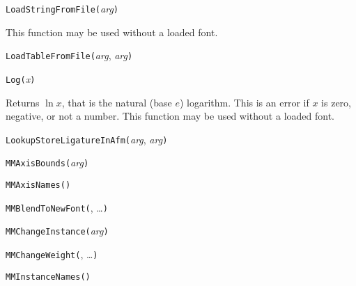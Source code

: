 

\texttt{LoadStringFromFile(}\textit{arg}\texttt{)}

This function may be used without a loaded font.



\texttt{LoadTableFromFile(}\textit{arg}, \textit{arg}\texttt{)}



\texttt{Log(}\textit{x}\texttt{)}

Returns $\ln x$, that is the natural (base $e$) logarithm.  This is an error
if $x$ is zero, negative, or not a number.
This function may be used without a loaded font.



\texttt{LookupStoreLigatureInAfm(}\textit{arg}, \textit{arg}\texttt{)}



\texttt{MMAxisBounds(}\textit{arg}\texttt{)}



\texttt{MMAxisNames(}\texttt{)}



\texttt{MMBlendToNewFont(}, \ldots\texttt{)}



\texttt{MMChangeInstance(}\textit{arg}\texttt{)}



\texttt{MMChangeWeight(}, \ldots\texttt{)}



\texttt{MMInstanceNames(}\texttt{)}

